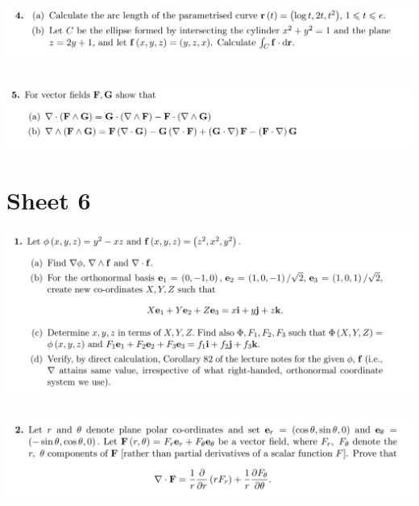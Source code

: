 \documentclass[12pt]{article}
\begin{document}
\subsection{}
\begin{mdframed}
  \includegraphics[width=400pt]{img/oxford-prelims-M5-multivariable-calc-5-4.png}
\end{mdframed}

\subsection{}
\begin{mdframed}
  \includegraphics[width=400pt]{img/oxford-prelims-M5-multivariable-calc-5-5.png}
\end{mdframed}


\newpage
\section{Sheet 6}
\begin{mdframed}
  \includegraphics[width=400pt]{img/oxford-prelims-M5-multivariable-calc-6-1.png}
\end{mdframed}

\subsection{}
\begin{mdframed}
  \includegraphics[width=400pt]{img/oxford-prelims-M5-multivariable-calc-6-2.png}
\end{mdframed}
\end{document}
